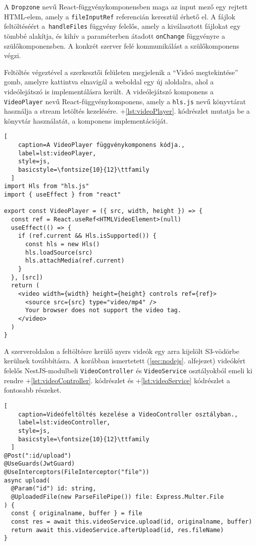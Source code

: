 A \verb|Dropzone| nevű React-függvénykomponensben maga az input mező egy rejtett HTML-elem, amely a \verb|fileInputRef| referencián keresztül érhető el. A fájlok feltöltéséért a~\verb|handleFiles| függvény felelős, amely a kiválasztott fájlokat egy tömbbé alakítja, és kihív a paraméterben átadott \verb|onChange| függvényre a szülőkomponensben. A konkrét szerver felé kommunikálást a szülőkomponens végzi.

Feltöltés végeztével a szerkesztői felületen megjelenik a ``Videó megtekintése'' gomb, amelyre kattintva elnavigál a weboldal egy új aloldalra, ahol a videólejátszó is implementálásra került. A videólejátszó komponens a \verb|VideoPlayer| nevű React-függvénykomponens, amely a \verb|hls.js| nevű könyvtárat használja a stream letöltés kezelésére. \Az+\ref{lst:videoPlayer}. kódrészlet mutatja be a könyvtár használatát, a komponens implementációját.

\begin{minipage}{0.92\textwidth}
  \begin{lstlisting}[
    caption=A VideoPlayer függvénykomponens kódja.,
    label=lst:videoPlayer,
    style=js,
    basicstyle=\fontsize{10}{12}\ttfamily
  ]
import Hls from "hls.js"
import { useEffect } from "react"

export const VideoPlayer = ({ src, width, height }) => {
  const ref = React.useRef<HTMLVideoElement>(null)
  useEffect(() => {
    if (ref.current && Hls.isSupported()) {
      const hls = new Hls()
      hls.loadSource(src)
      hls.attachMedia(ref.current)
    }
  }, [src])
  return (
    <video width={width} height={height} controls ref={ref}>
      <source src={src} type="video/mp4" />
      Your browser does not support the video tag.
    </video>
  )
}
\end{lstlisting}
\end{minipage}

A szerveroldalon a feltöltésre kerülő nyers videók egy arra kijelölt S3-vödörbe kerülnek továbbításra. A korábban ismertetett (\ref{sec:nodejs}. alfejezet) videókért felelős NestJS-modulbeli \verb|VideoController| és \verb|VideoService| osztályokból emeli ki rendre \az+\ref{lst:videoController}. kódrészlet és \az+\ref{lst:videoService} kódrészlet a fontosabb részeket.

\begin{minipage}{0.92\textwidth}
  \begin{lstlisting}[
    caption=Videófeltöltés kezelése a VideoController osztályban.,
    label=lst:videoController,
    style=js,
    basicstyle=\fontsize{10}{12}\ttfamily
  ]
@Post(":id/upload")
@UseGuards(JwtGuard)
@UseInterceptors(FileInterceptor("file"))
async upload(
  @Param("id") id: string,
  @UploadedFile(new ParseFilePipe()) file: Express.Multer.File
) {
  const { originalname, buffer } = file
  const res = await this.videoService.upload(id, originalname, buffer)
  return await this.videoService.afterUpload(id, res.fileName)
}
\end{lstlisting}
\end{minipage}

